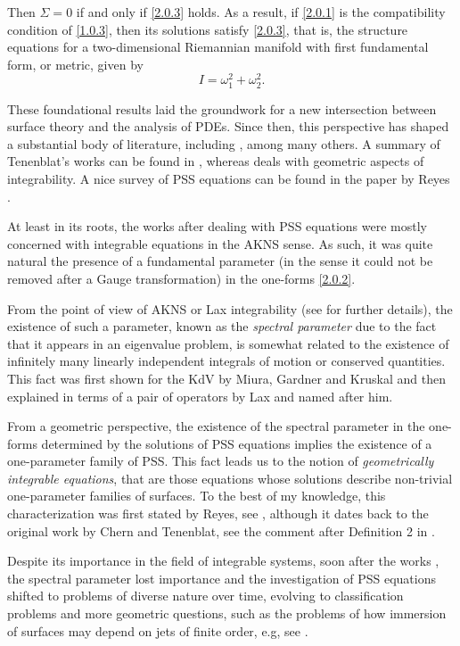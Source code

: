 \documentclass{cimart}
\newcommand{\bb}{\begin{equation}}
\newcommand{\ee}{\end{equation}}
\begin{document}
Then $\Sigma=0$ if and only if \eqref{2.0.3} holds. As a result, if \eqref{2.0.1} is the compatibility condition of \eqref{1.0.3}, then its solutions satisfy \eqref{2.0.3}, that is, the structure equations for a two-dimensional Riemannian manifold with first fundamental form, or metric, given by
\bb
I=\omega_1^2+\omega_2^2.
\ee

These foundational results laid the groundwork for a new intersection between surface theory and the analysis of PDEs. Since then, this perspective has shaped a substantial body of literature, including \cite{beals,keti2015,tarcisio,cat,nilay,freire-tito-sam,reyes2000,reyes2002,reyes2006-sel,reyes2006-jde,reyes2011,nazime}, among many others. A summary of Tenenblat's works can be found in \cite[Chapter 1]{keti-book}, whereas \cite{reyes2000} deals with geometric aspects of integrability. A nice survey of PSS equations can be found in the paper by Reyes \cite{reyes2011}.

At least in its roots, the works after \cite{chern} dealing with PSS equations were mostly concerned with integrable equations in the AKNS sense. As such, it was quite natural the presence of a fundamental parameter (in the sense it could not be removed after a Gauge transformation) in the one-forms \eqref{2.0.2}.

From the point of view of AKNS or Lax integrability (see \cite{drazin} for further details), the existence of such a parameter, known as the {\it spectral parameter} due to the fact that it appears in an eigenvalue problem, is somewhat related to the existence of infinitely many linearly independent integrals of motion or conserved quantities. This fact was first shown for the KdV by Miura, Gardner and Kruskal \cite{miura} and then explained in terms of a pair of operators by Lax \cite{lax} and named after him.

From a geometric perspective, the existence of the spectral parameter in the one-forms determined by the solutions of PSS equations implies the existence of a one-parameter family of PSS. This fact leads us to the notion of {\it geometrically integrable equations}, that are those equations whose solutions describe non-trivial one-parameter families of surfaces. To the best of my knowledge, this characterization was first stated by Reyes, see \cite[Definition 2]{reyes2000}, although it dates back to the original work by Chern and Tenenblat, see the comment after Definition 2 in \cite{reyes2000}.

 Despite its importance in the field of integrable systems, soon after the works \cite{sasaki,chern}, the spectral parameter lost importance and the investigation of PSS equations shifted to problems of diverse nature over time, evolving to classification problems and more geometric questions, such as the problems of how immersion of surfaces may depend on jets of finite order, e.g, see \cite{kah-book, kah-cag, kah}.
\end{document}
